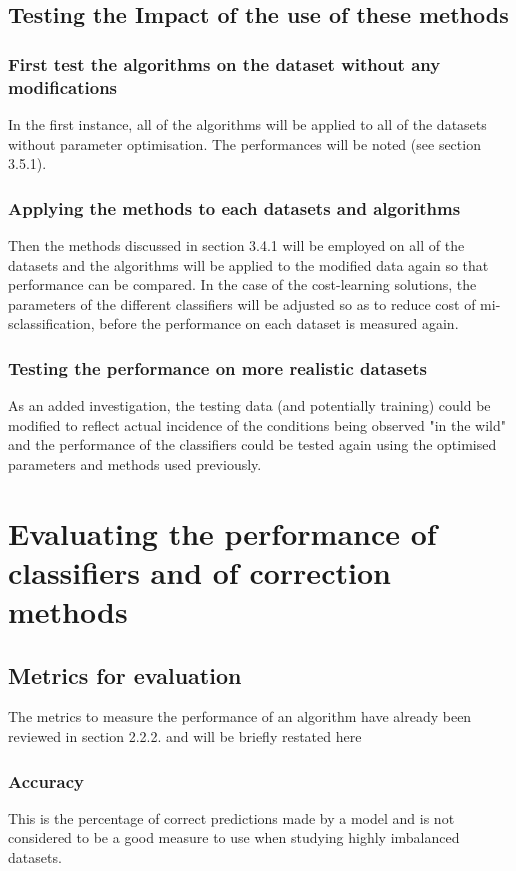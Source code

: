 \subsection{Testing the Impact of the use of these methods}
\subsubsection{First test the algorithms on the dataset without any modifications}
In the first instance, all of the algorithms will be applied to all of the datasets without parameter optimisation. The performances will be noted (see section 3.5.1). 

\subsubsection{Applying the methods to each datasets and algorithms}

Then the methods discussed in section 3.4.1 will be employed on all of the datasets and the algorithms will be applied to the modified data again so that performance can be compared.\newline 
In the case of the cost-learning solutions, the parameters of the different classifiers will be adjusted so as to reduce cost of mi-sclassification, before the performance on each dataset is measured again.

\subsubsection{Testing the performance on more realistic datasets}
As an added investigation, the testing data (and potentially training) could be modified to reflect actual incidence of the conditions being observed "in the wild" and the performance of the classifiers could be tested again using the optimised parameters and methods used previously.

\section{Evaluating the performance of classifiers and of correction methods}

\subsection{Metrics for evaluation}  
The metrics to measure the performance of an algorithm have already been reviewed in section 2.2.2. and will be briefly restated here
\subsubsection{Accuracy}
This is the percentage of correct predictions made by a model and is not considered to be a good measure to use when studying highly imbalanced datasets.


